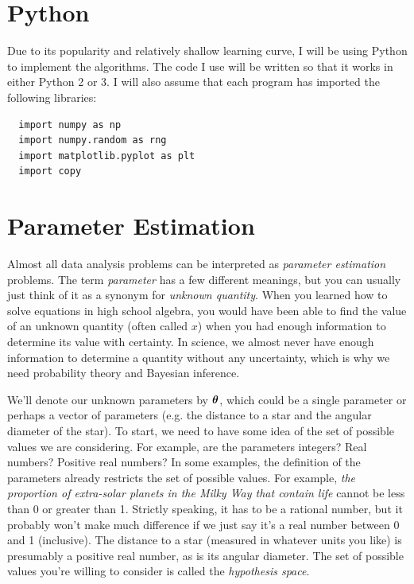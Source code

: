 
\section{Python}
Due to its popularity and relatively shallow learning curve,
I will be using Python to implement the algorithms. The code I use will be
written so that it works in either Python 2 or 3. I will also assume that
each program has imported the following libraries:

\begin{verbatim}
  import numpy as np
  import numpy.random as rng
  import matplotlib.pyplot as plt
  import copy
\end{verbatim}



\section{Parameter Estimation}
Almost all data analysis problems can be interpreted as {\it parameter
estimation} problems. The term {\it parameter} has a few different meanings,
but you can usually just think of it as a synonym for {\it unknown quantity}.
When you learned how to solve equations in high school algebra,
you would have been able to find the value of an unknown quantity
(often called $x$) when you had
enough information to determine its value with certainty.
In science, we almost never have enough information to determine a quantity
without any uncertainty, which is why we need probability theory and Bayesian
inference.

We'll denote our unknown parameters by $\boldsymbol{\theta}$, which could be a single
parameter or perhaps a vector of parameters (e.g. the distance to a star
and the angular diameter of the star). To start, we
need to have some idea of the set of possible values we are considering. For
example, are the parameters integers? Real numbers? Positive real numbers?
In some examples, the definition of the parameters already restricts the set
of possible values. For example, {\it the proportion of extra-solar planets in
the Milky Way that contain life} cannot be less than 0 or greater than 1.
Strictly speaking, it has to be a rational number, but it probably won't make
much difference if we just say it's a real number between 0 and 1 (inclusive).
The distance to a star (measured in whatever units you like) is presumably a
positive real number, as is its angular diameter.
The set of possible values you're willing to consider is called the
{\it hypothesis space}.

